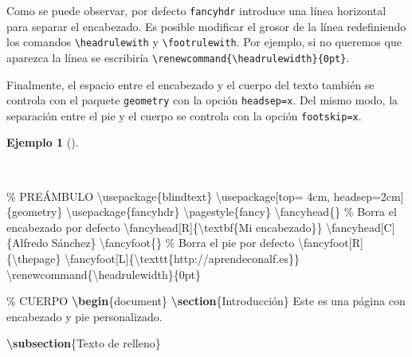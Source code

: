 \documentclass[
  a4paper,
]{scrreport}
\newenvironment{Shaded}{\begin{snugshade}}{\end{snugshade}}
\newcommand{\BuiltInTok}[1]{\textcolor[rgb]{0.00,0.23,0.31}{#1}}
\newcommand{\CommentTok}[1]{\textcolor[rgb]{0.37,0.37,0.37}{#1}}
\newcommand{\ExtensionTok}[1]{\textcolor[rgb]{0.00,0.23,0.31}{#1}}
\newcommand{\FunctionTok}[1]{\textcolor[rgb]{0.28,0.35,0.67}{#1}}
\newcommand{\KeywordTok}[1]{\textcolor[rgb]{0.00,0.23,0.31}{\textbf{#1}}}
\newcommand{\NormalTok}[1]{\textcolor[rgb]{0.00,0.23,0.31}{#1}}
\theoremstyle{definition}
\newtheorem{example}{Ejemplo}[chapter]
\theoremstyle{remark}
\begin{document}
Como se puede observar, por defecto \texttt{fancyhdr} introduce una
línea horizontal para separar el encabezado. Es posible modificar el
grosor de la línea redefiniendo los comandos
\texttt{\textbackslash{}headrulewith} y
\texttt{\textbackslash{}footrulewith}. Por ejemplo, si no queremos que
aparezca la línea se escribiría
\texttt{\textbackslash{}renewcommand\{\textbackslash{}headrulewidth\}\{0pt\}}.

Finalmente, el espacio entre el encabezado y el cuerpo del texto también
se controla con el paquete \texttt{geometry} con la opción
\texttt{headsep=x}. Del mismo modo, la separación entre el pie y el
cuerpo se controla con la opción \texttt{footskip=x}.

\begin{example}[]\protect\hypertarget{exm-encabezado-pie-2}{}\label{exm-encabezado-pie-2}

~

\begin{Shaded}
\begin{Highlighting}[]
\CommentTok{\% PREÁMBULO}
\BuiltInTok{\textbackslash{}usepackage}\NormalTok{\{}\ExtensionTok{blindtext}\NormalTok{\}}
\BuiltInTok{\textbackslash{}usepackage}\NormalTok{[top= 4cm, headsep=2cm]\{}\ExtensionTok{geometry}\NormalTok{\}}
\BuiltInTok{\textbackslash{}usepackage}\NormalTok{\{}\ExtensionTok{fancyhdr}\NormalTok{\}}
\FunctionTok{\textbackslash{}pagestyle}\NormalTok{\{fancy\}}
\FunctionTok{\textbackslash{}fancyhead}\NormalTok{\{\} }\CommentTok{\% Borra el encabezado por defecto}
\FunctionTok{\textbackslash{}fancyhead}\NormalTok{[R]\{}\FunctionTok{\textbackslash{}textbf}\NormalTok{\{Mi encabezado\}\}}
\FunctionTok{\textbackslash{}fancyhead}\NormalTok{[C]\{Alfredo Sánchez\}}
\FunctionTok{\textbackslash{}fancyfoot}\NormalTok{\{\} }\CommentTok{\% Borra el pie por defecto}
\FunctionTok{\textbackslash{}fancyfoot}\NormalTok{[R]\{}\FunctionTok{\textbackslash{}thepage}\NormalTok{\}}
\FunctionTok{\textbackslash{}fancyfoot}\NormalTok{[L]\{}\FunctionTok{\textbackslash{}texttt}\NormalTok{\{http://aprendeconalf.es\}\}}
\FunctionTok{\textbackslash{}renewcommand}\NormalTok{\{}\ExtensionTok{\textbackslash{}headrulewidth}\NormalTok{\}\{0pt\}}

\CommentTok{\% CUERPO}
\KeywordTok{\textbackslash{}begin}\NormalTok{\{}\ExtensionTok{document}\NormalTok{\}}
\KeywordTok{\textbackslash{}section}\NormalTok{\{Introducción\}}
\NormalTok{Este es una página con encabezado y pie personalizado.}

\KeywordTok{\textbackslash{}subsection}\NormalTok{\{Texto de relleno\}}


\end{Highlighting}
\end{Shaded}
\end{example}
\end{document}
